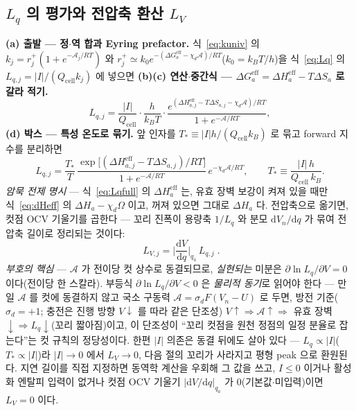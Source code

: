 \documentclass[11pt,a4paper]{article}
\newcommand{\dd}{\mathrm{d}}
\newcommand{\eff}{\mathrm{eff}}
\newcommand{\cell}{\mathrm{cell}}
\begin{document}
\subsection{$L_q$ 의 평가와 전압축 환산 $L_V$}
\textbf{(a) 출발 — 정$\cdot$역 합과 Eyring prefactor.} 식~\eqref{eq:kuniv} 의 $k_j=r_j^+(1+e^{-\mathcal A_j/RT})$ 와
$r_j^+\simeq k_0e^{-(\Delta G_a^\eff-\chi_d\mathcal A)/RT}$($k_0=k_BT/h$)을 식~\eqref{eq:Lq} 의 $L_{q,j}=|I|/(Q_\cell k_j)$
에 넣으면 \textbf{(b)(c) 연산$\cdot$중간식 — $\Delta G_a^\eff=\Delta H_a^\eff-T\Delta S_a$ 로 갈라 적기.}
\begin{equation}
L_{q,j}=\frac{|I|}{Q_\cell}\cdot\frac{h}{k_BT}\cdot
\frac{e^{(\Delta H_{a,j}^\eff-T\Delta S_{a,j}-\chi_d\mathcal A)/RT}}{1+e^{-\mathcal A/RT}},
\label{eq:Lqmid2}
\end{equation}
\textbf{(d) 박스 — 특성 온도로 묶기.} 앞 인자를 $T_*\equiv|I|h/(Q_\cell k_B)$ 로 묶고 forward 지수를 분리하면
\begin{equation}
L_{q,j}=\frac{T_*}{T}\,\frac{\exp\!\big[(\Delta H_{a,j}^\eff-T\Delta S_{a,j})/RT\big]}{1+e^{-\mathcal A/RT}}
\,e^{-\chi_d\mathcal A/RT},
\qquad T_*\equiv\frac{|I|\,h}{Q_\cell\,k_B}.
\label{eq:Lqfull}
\end{equation}
\emph{암묵 전제 명시} — 식~\eqref{eq:Lqfull} 의
$\Delta H_a^\eff$ 는, 유효 장벽 보강이 켜져 있을 때만 식~\eqref{eq:dHeff} 의 $\Delta H_a-\chi_d\Omega$ 이고,
꺼져 있으면 그대로 $\Delta H_a$ 다. 전압축으로 옮기면, 컷점 OCV 기울기를 곱한다 — 꼬리 진폭이
용량축 $1/L_q$ 와 분모 $\dd V_n/\dd q$ 가 묶여 전압축 길이로 정리되는 것이다:
\begin{equation}
\boxed{\;L_{V,j}=\Big|\frac{\dd V}{\dd q}\Big|_{q_a}\,L_{q,j}\;.}
\label{eq:LV}
\end{equation}
\emph{부호의 핵심} — $\mathcal A$ 가 전이당 컷 상수로 동결되므로, \emph{실현되는} 미분은
$\partial\ln L_q/\partial V=0$ 이다(전이당 한 스칼라). 부등식 $\partial\ln L_q/\partial V<0$ 은 \emph{물리적 동기}로 읽어야
한다 — 만일 $\mathcal A$ 를 컷에 동결하지 않고 국소 구동력 $\mathcal A=\sigma_dF(V_n-U)$ 로 두면, 방전
기준($\sigma_d=+1$; 충전은 진행 방향 $V\!\downarrow$ 를 따라 같은 단조성) $V\!\uparrow\Rightarrow
\mathcal A\!\uparrow\Rightarrow$ 유효 장벽$\downarrow\Rightarrow L_q\downarrow$(꼬리 짧아짐)이고, 이 단조성이 ``꼬리 컷점을
원천 정점의 일정 분율로 잡는다''는 컷 규칙의 정당성이다. 한편 $|I|$ 의존은 동결 뒤에도 살아 있다 — $L_q\propto|I|$($T_*\propto|I|$)라 $|I|\to0$
에서 $L_V\to0$, 다음 절의 꼬리가 사라지고 평형 peak 으로 환원된다. 지연 길이를 직접 지정하면 동역학 계산을 우회해
그 값을 쓰고, $I\le0$ 이거나 활성화 엔탈피 입력이 없거나 컷점 OCV 기울기 $|\dd V/\dd q|_{q_a}$ 가
$0$(기본값$\cdot$미입력)이면 $L_V=0$ 이다.
\end{document}
